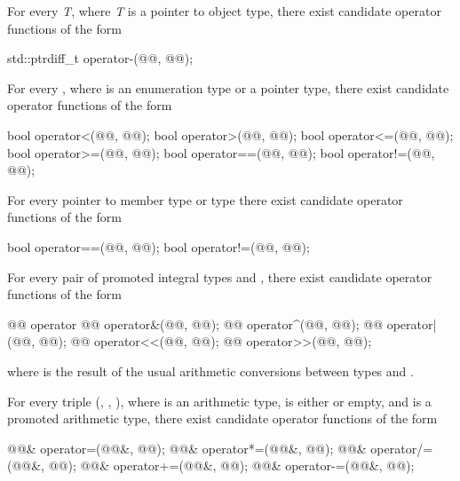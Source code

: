 \pnum
For every
\textit{T},
where
\textit{T}
is a pointer to object type,
there exist candidate operator functions of the form

\begin{codeblock}
std::ptrdiff_t   operator-(@@, @@);
\end{codeblock}

\pnum
For every , where  is an enumeration type or a pointer type,
there exist candidate operator functions of the form

\begin{codeblock}
bool    operator<(@@, @@);
bool    operator>(@@, @@);
bool    operator<=(@@, @@);
bool    operator>=(@@, @@);
bool    operator==(@@, @@);
bool    operator!=(@@, @@);
\end{codeblock}

\pnum
For every pointer to member type  or type  there
exist candidate operator functions of the form

\begin{codeblock}
bool    operator==(@@, @@);
bool    operator!=(@@, @@);
\end{codeblock}

\pnum
For every pair of promoted integral types
and
,
there exist candidate operator functions of the form

\begin{codeblock}
@@      operator%
@@      operator&(@@, @@);
@@      operator^(@@, @@);
@@      operator|(@@, @@);
@@       operator<<(@@, @@);
@@       operator>>(@@, @@);
\end{codeblock}

where
is the result of the usual arithmetic conversions between types
and
.

\pnum
For every triple
(,
,
),
where
is an arithmetic type,
is either
or empty,
and
is a promoted arithmetic type,
there exist candidate operator functions of the form

\begin{codeblock}
@@&   operator=(@@&, @@);
@@&   operator*=(@@&, @@);
@@&   operator/=(@@&, @@);
@@&   operator+=(@@&, @@);
@@&   operator-=(@@&, @@);
\end{codeblock}

